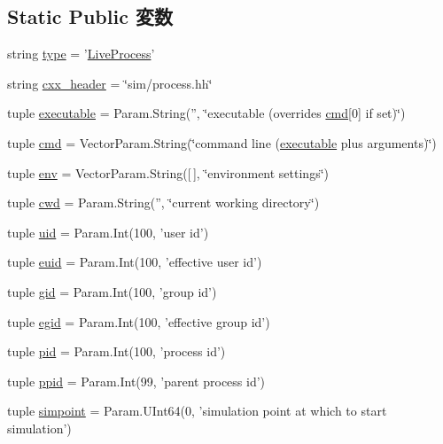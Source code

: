 \subsection*{Static Public 変数}
\begin{DoxyCompactItemize}
\item 
string \hyperlink{classProcess_1_1LiveProcess_acce15679d830831b0bbe8ebc2a60b2ca}{type} = '\hyperlink{classProcess_1_1LiveProcess}{LiveProcess}'
\item 
string \hyperlink{classProcess_1_1LiveProcess_a17da7064bc5c518791f0c891eff05fda}{cxx\_\-header} = \char`\"{}sim/process.hh\char`\"{}
\item 
tuple \hyperlink{classProcess_1_1LiveProcess_a1bc0ecd58c0cf2d4d931ef9b5028f86b}{executable} = Param.String('', \char`\"{}executable (overrides \hyperlink{classProcess_1_1LiveProcess_acb0104594e2a37355704eb5ce2484ec1}{cmd}\mbox{[}0\mbox{]} if set)\char`\"{})
\item 
tuple \hyperlink{classProcess_1_1LiveProcess_acb0104594e2a37355704eb5ce2484ec1}{cmd} = VectorParam.String(\char`\"{}command line (\hyperlink{classProcess_1_1LiveProcess_a1bc0ecd58c0cf2d4d931ef9b5028f86b}{executable} plus arguments)\char`\"{})
\item 
tuple \hyperlink{classProcess_1_1LiveProcess_a8618073d5c1938c3c6d5ae0e34489f49}{env} = VectorParam.String(\mbox{[}$\,$\mbox{]}, \char`\"{}environment settings\char`\"{})
\item 
tuple \hyperlink{classProcess_1_1LiveProcess_abbfa4358925986ea5d974c103e28e5f2}{cwd} = Param.String('', \char`\"{}current working directory\char`\"{})
\item 
tuple \hyperlink{classProcess_1_1LiveProcess_a769779ff2ed72928f198f7facc70ec85}{uid} = Param.Int(100, 'user id')
\item 
tuple \hyperlink{classProcess_1_1LiveProcess_a8c9f048007df8b6d47f351e056412af6}{euid} = Param.Int(100, 'effective user id')
\item 
tuple \hyperlink{classProcess_1_1LiveProcess_afcfecdbbf80de1acde74dcf4a3693524}{gid} = Param.Int(100, 'group id')
\item 
tuple \hyperlink{classProcess_1_1LiveProcess_ab9c18042878b79c81ce003cfca764ddb}{egid} = Param.Int(100, 'effective group id')
\item 
tuple \hyperlink{classProcess_1_1LiveProcess_a78ed56667ab024ecb8e09b63a3ffab77}{pid} = Param.Int(100, 'process id')
\item 
tuple \hyperlink{classProcess_1_1LiveProcess_a5f79b91788a6bbc4376a0ee7ee1a62c3}{ppid} = Param.Int(99, 'parent process id')
\item 
tuple \hyperlink{classProcess_1_1LiveProcess_a388cf7cbe49669d2dd81edb0bc543b41}{simpoint} = Param.UInt64(0, 'simulation point at which to start simulation')
\end{DoxyCompactItemize}


